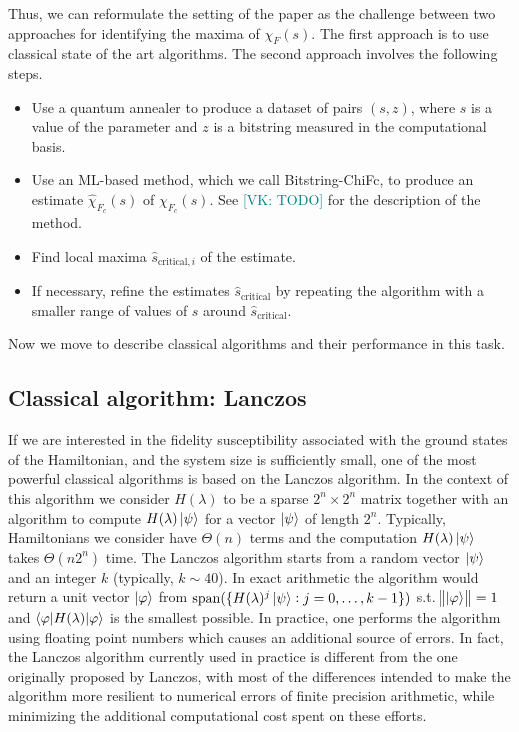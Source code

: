 \documentclass[american,aps,pra,reprint,floatfix,nofootinbib,superscriptaddress]{revtex4-2}
\DeclareMathOperator{\mspan}{span}
\newcommand{\VK}[1]{\textcolor{teal}{[VK: #1]}}
\begin{document}
Thus, we can reformulate the setting of the paper as the challenge
between two approaches for identifying the maxima of $\chi_F(s)$.
The first approach is to use classical state of the art algorithms.
The second approach involves the following steps.
\begin{itemize}
  \item Use a quantum annealer to produce a dataset of pairs $(s,z)$,
    where $s$ is a value of the parameter and $z$ is a bitstring
    measured in the computational basis.
  \item Use an ML-based method, which we call Bitstring-ChiFc,
    to produce an estimate
    $\widehat\chi_{F_c}(s)$ of $\chi_{F_c}(s)$.
    See \VK{TODO} for the description of the method.
  \item Find local maxima $\hat s_{\textrm{critical},i}$ of the estimate.
  \item If necessary, refine the estimates $\hat s_{\textrm{critical}}$
    by repeating the algorithm with a smaller range of values of $s$
    around $\hat s_{\textrm{critical}}$.
\end{itemize}

Now we move to describe classical algorithms and their performance in this
task.

\subsection{Classical algorithm: Lanczos}
If we are interested in the fidelity susceptibility associated
with the ground states of the Hamiltonian, and the system size is sufficiently small,
one of the most powerful classical algorithms is based on the Lanczos algorithm.
In the context of this algorithm we consider $H(\lambda)$ to be
a sparse $2^n \times 2^n$ matrix together with an algorithm to compute
$H(\lambda)\ket{\psi}$ for a vector $\ket{\psi}$ of length $2^n$.
Typically, Hamiltonians we consider have
$\Theta(n)$ terms and the computation $H(\lambda)\ket{\psi}$
takes $\Theta(n2^n)$ time. The Lanczos algorithm starts from
a random vector $\ket{\psi}$ and an integer $k$ (typically,
$k \sim 40$). In exact arithmetic the algorithm would
return a unit vector $\ket{\varphi}$ from
$\mspan(\{H(\lambda)^j\ket{\psi}: j=0,\dots,k-1\})$
s.t. $\norm{\ket{\varphi}} = 1$ and $\braket{\varphi|H(\lambda)|\varphi}$
is the smallest possible. In practice, one performs the algorithm
using floating point numbers which causes an additional source of errors.
In fact, the Lanczos algorithm currently used in practice is different
from the one originally proposed by Lanczos, with most of the differences
intended to make the algorithm more resilient to numerical errors of
finite precision arithmetic, while minimizing the additional computational
cost spent on these efforts.
\end{document}
